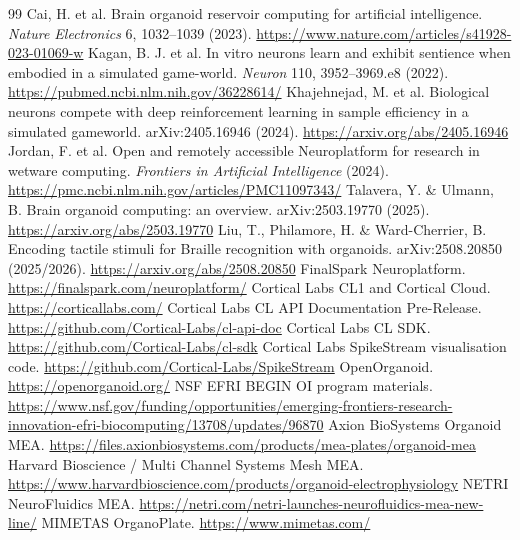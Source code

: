 \documentclass[10pt,twocolumn]{article}
\begin{document}
\begin{thebibliography}{99}
 Cai, H. et al. Brain organoid reservoir computing for artificial intelligence. \emph{Nature Electronics} 6, 1032--1039 (2023). \url{https://www.nature.com/articles/s41928-023-01069-w}
 Kagan, B. J. et al. In vitro neurons learn and exhibit sentience when embodied in a simulated game-world. \emph{Neuron} 110, 3952--3969.e8 (2022). \url{https://pubmed.ncbi.nlm.nih.gov/36228614/}
 Khajehnejad, M. et al. Biological neurons compete with deep reinforcement learning in sample efficiency in a simulated gameworld. arXiv:2405.16946 (2024). \url{https://arxiv.org/abs/2405.16946}
 Jordan, F. et al. Open and remotely accessible Neuroplatform for research in wetware computing. \emph{Frontiers in Artificial Intelligence} (2024). \url{https://pmc.ncbi.nlm.nih.gov/articles/PMC11097343/}
 Talavera, Y. \& Ulmann, B. Brain organoid computing: an overview. arXiv:2503.19770 (2025). \url{https://arxiv.org/abs/2503.19770}
 Liu, T., Philamore, H. \& Ward-Cherrier, B. Encoding tactile stimuli for Braille recognition with organoids. arXiv:2508.20850 (2025/2026). \url{https://arxiv.org/abs/2508.20850}
 FinalSpark Neuroplatform. \url{https://finalspark.com/neuroplatform/}
 Cortical Labs CL1 and Cortical Cloud. \url{https://corticallabs.com/}
 Cortical Labs CL API Documentation Pre-Release. \url{https://github.com/Cortical-Labs/cl-api-doc}
 Cortical Labs CL SDK. \url{https://github.com/Cortical-Labs/cl-sdk}
 Cortical Labs SpikeStream visualisation code. \url{https://github.com/Cortical-Labs/SpikeStream}
 OpenOrganoid. \url{https://openorganoid.org/}
 NSF EFRI BEGIN OI program materials. \url{https://www.nsf.gov/funding/opportunities/emerging-frontiers-research-innovation-efri-biocomputing/13708/updates/96870}
 Axion BioSystems Organoid MEA. \url{https://files.axionbiosystems.com/products/mea-plates/organoid-mea}
 Harvard Bioscience / Multi Channel Systems Mesh MEA. \url{https://www.harvardbioscience.com/products/organoid-electrophysiology}
 NETRI NeuroFluidics MEA. \url{https://netri.com/netri-launches-neurofluidics-mea-new-line/}
 MIMETAS OrganoPlate. \url{https://www.mimetas.com/}

\end{thebibliography}
\end{document}
